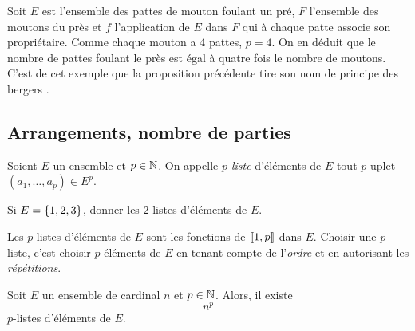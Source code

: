 \documentclass{magnolia}
\begin{document}
\begin{remarqueUnique}
\remarque Soit $E$ est l'ensemble des pattes de mouton foulant un pré, $F$
  l'ensemble des moutons du près et $f$ l'application de $E$ dans $F$ qui à chaque
  patte associe son propriétaire. Comme chaque mouton a 4 pattes, $p=4$.
  On en déduit que le nombre de pattes foulant le près est égal à quatre fois
  le nombre de moutons. C'est de cet exemple que la proposition précédente
  tire son nom de \og principe des bergers \fg.
\end{remarqueUnique}

  
\subsection{Arrangements, nombre de parties}


\begin{definition}[nom={$p$-listes}]
Soient $E$ un ensemble et $p\in\mathbb{N}$. On appelle \emph{$p$-liste} d'éléments de $E$ tout
$p$-uplet $(a_1,\ldots,a_p)\in E^p$.
\end{definition}

\begin{exoUnique}
\exo Si $E=\left\{1,2,3\right\}$, donner les $2$-listes d'éléments de $E$.
\end{exoUnique}

\begin{remarques}
\remarque Les $p$-listes d'éléments de $E$ sont les fonctions de $\left\llbracket 1,p\right\rrbracket$ dans $E$.
\remarque Choisir une $p$-liste, c'est choisir $p$ éléments de $E$ en tenant
  compte de  l'\emph{ordre} et en autorisant les \emph{répétitions}.
\end{remarques}

\begin{proposition}[nom={Nombre de listes}]
Soit $E$ un ensemble de cardinal $n$ et $p\in\mathbb{N}$. Alors, il existe
\[n^p\]
$p$-listes d'éléments de $E$.
\end{proposition}

\end{document}
